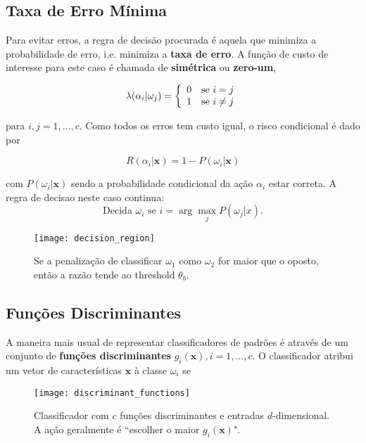 \subsection{Taxa de Erro Mínima}

Para evitar erros, a regra de decisão procurada é aquela que minimiza a probabilidade de erro, i.e. minimiza a \textbf{taxa de erro}. A função de custo de interesse para este caso é chamada de \textbf{simétrica} ou \textbf{zero-um},

\begin{equation}
    \lambda(\alpha_i|\omega_j) = \left\{ \begin{array}{ll} 0 & \mbox{se } i=j \\ 1 & \mbox{se } i \neq j \end{array} \right.
    \label{eq:loss_zero_one}
\end{equation}

\noindent para $i, j = 1, ..., c$. Como todos os erros tem custo igual, o risco condicional é dado por

\begin{equation}
    R(\alpha_i|\boldsymbol{x}) = 1 - P(\omega_i|\boldsymbol{x})
    \label{eq:conditional_risk_zero_one}
\end{equation}

\noindent com $P(\omega_i|\boldsymbol{x})$ sendo a probabilidade condicional da ação $\alpha_i$ estar correta. A regra de decisao neste caso continua:
\begin{equation}
    \text{Decida } \omega_i \text{ se } i = \arg\max_j P(\omega_j|x).
    \label{eq:decision_5}
\end{equation}

\begin{figure}[ht]
    \centering
    \texttt{[image: decision\_region]}
    \caption{Se a penalização de classificar $\omega_1$ como $\omega_2$ for maior que o oposto, então a razão tende ao threshold $\theta_b$.}
    \label{fig:decision_region}
\end{figure}

\subsection{Funções Discriminantes}

A maneira mais usual de representar classificadores de padrões é através de um conjunto de \textbf{funções discriminantes} $g_i(\boldsymbol{x}), i = 1, ..., c$. O classificador atribui um vetor de características $\boldsymbol{x}$ à classe $\omega_i$ se

\begin{figure}[ht]
    \centering
    \texttt{[image: discriminant\_functions]}
    \caption{Classificador com $c$ funções discriminantes e entradas $d$-dimensional. A ação geralmente é ``escolher o maior $g_i(\boldsymbol{x})$".}
    \label{fig:discriminant_functions}
\end{figure}

